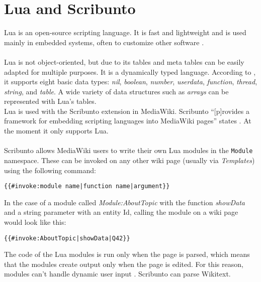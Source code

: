 \section{Lua and Scribunto}

Lua is an open-source scripting language. It is fast and lightweight and is used mainly in embedded systems, often to customize other software \citep{lua:01}. \\
\\
Lua is not object-oriented, but due to its tables and meta tables can be easily adapted for multiple purposes. It is a dynamically typed language. According to \citet[9]{luabook:01}, it supports eight basic data types: \textit{nil}, \textit{boolean}, \textit{number}, \textit{userdata}, \textit{function}, \textit{thread}, \textit{string}, and \textit{table}. A wide variety of data structures such as \textit{arrays} can be represented with Lua's tables. \\
Lua is used with the Scribunto extension in MediaWiki. Scribunto ``[p]rovides a framework for embedding scripting languages into MediaWiki pages'' states \citet{wiki:19}. At the moment it only supports Lua. \\
\\
Scribunto allows MediaWiki users to write their own Lua modules in the \texttt{\justify Module} namespace. These can be invoked on any other wiki page (usually via \textit{Templates}) using the following command:
\begin{lstlisting}[frame=single] 
{{#invoke:module name|function name|argument}}
\end{lstlisting}

In the case of a module called \textit{Module:AboutTopic} with the function \textit{showData} and a string parameter with an entity Id, calling the module on a wiki page would look like this:
\begin{lstlisting}[frame=single] 
{{#invoke:AboutTopic|showData|Q42}}
\end{lstlisting}

The code of the Lua modules is run only when the page is parsed, which means that the modules create output only when the page is edited. For this reason, modules can't handle dynamic user input \citep{wiki:20}. Scribunto can parse Wikitext.
